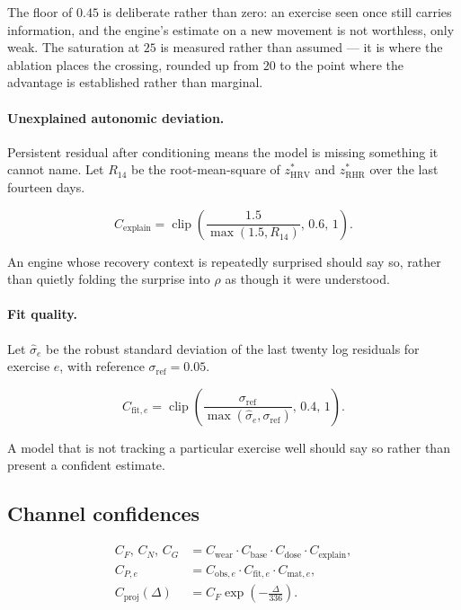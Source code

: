 \documentclass[11pt]{article}
\begin{document}
The floor of $0.45$ is deliberate rather than zero: an exercise seen once still carries information, and the engine's estimate on a new movement is not worthless, only weak. The saturation at $25$ is measured rather than assumed --- it is where the ablation places the crossing, rounded up from $20$ to the point where the advantage is established rather than marginal.

\paragraph{Unexplained autonomic deviation.} Persistent residual after conditioning means the model is missing something it cannot name. Let $R_{14}$ be the root-mean-square of $z^{\ast}_{\mathrm{HRV}}$ and $z^{\ast}_{\mathrm{RHR}}$ over the last fourteen days.

\begin{equation}
C_{\mathrm{explain}}=\operatorname{clip}\left(\frac{1.5}{\max(1.5,R_{14})},\,0.6,\,1\right).
\end{equation}

An engine whose recovery context is repeatedly surprised should say so, rather than quietly folding the surprise into $\rho$ as though it were understood.

\paragraph{Fit quality.} Let $\hat\sigma_e$ be the robust standard deviation of the last twenty log residuals for exercise $e$, with reference $\sigma_{\mathrm{ref}}=0.05$.

\begin{equation}
C_{\mathrm{fit},e}=\operatorname{clip}\!\left(\frac{\sigma_{\mathrm{ref}}}{\max(\hat\sigma_e,\sigma_{\mathrm{ref}})},\,0.4,\,1\right).
\end{equation}

A model that is not tracking a particular exercise well should say so rather than present a confident estimate.

\subsection{Channel confidences}

\begin{align}
C_{F},\,C_{N},\,C_{G}&=C_{\mathrm{wear}}\cdot C_{\mathrm{base}}\cdot C_{\mathrm{dose}}\cdot C_{\mathrm{explain}},\\
C_{P,e}&=C_{\mathrm{obs},e}\cdot C_{\mathrm{fit},e}\cdot C_{\mathrm{mat},e},\\
C_{\mathrm{proj}}(\Delta)&=C_{F}\exp\!\left(-\frac{\Delta}{336}\right).
\end{align}
\end{document}
